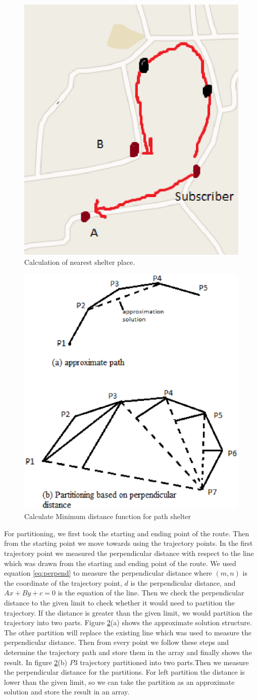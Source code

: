 \documentclass[conference]{IEEEtran}
\begin{document}
\begin{figure}[htp]
	\centering
		\includegraphics[width=.35\textwidth]{fig/optimalp.eps}
	\caption{ Calculation of nearest shelter place. }
	\label{Figure:optimal}
\end{figure}


\begin{figure}[ht]
	\centering
		\includegraphics[width=.5\textwidth]{fig/trajectory.eps}
	\caption{Calculate Minimum distance function for path shelter}
	\label{Figure:MDLCOST}
\end{figure}
 

For partitioning, we first took the starting and ending point of the route. Then from the starting point we move towards using the trajectory points. In the first trajectory point we measured the perpendicular distance with respect to the line which was drawn from the starting and ending point of the route. We used equation \ref{eq:perpend} to measure the perpendicular distance where $(m,n)$ is the coordinate of the trajectory point, $d$ is the perpendicular distance, and $Ax+By+c=0$ is the equation of the line. Then we check the perpendicular distance to the given limit to check whether it would need to partition the trajectory. If the distance is greater than the given limit, we would partition the trajectory into two parts. Figure \ref{Figure:MDLCOST}(a) shows the approximate solution structure. The other partition will replace the existing line which was used to measure the perpendicular distance. Then from every point we follow these steps and determine the trajectory path and store them in the array and finally shows the result. In figure \ref{Figure:MDLCOST}(b) $P3$ trajectory partitioned into two parts.Then we measure the perpendicular distance for the partitions. For left partition the distance is lower than the given limit, so we can take the partition as an approximate solution and store the result in an array. 
\end{document}
